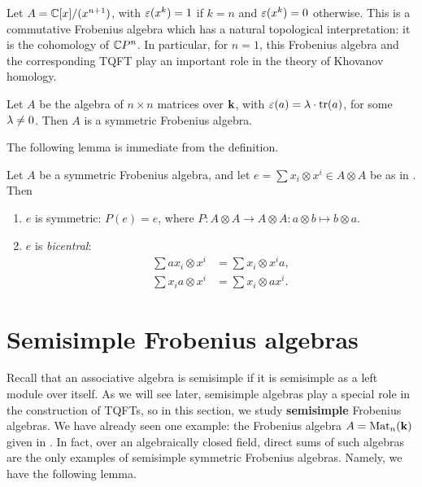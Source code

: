 \begin{example}\label{x:frobenius1}
  Let $A=\mathbb{C}[x]/(x^{n+1})$, with $\varepsilon(x^k)=1$ if $k=n$ and
  $\varepsilon(x^k)=0$ otherwise. This is a commutative Frobenius algebra which
  has a natural topological interpretation: it is the cohomology of
  $\mathbb{C} P^n$. In particular, for $n=1$, this Frobenius algebra and the
  corresponding TQFT play an important role in the theory of Khovanov
  homology.
\end{example}
\begin{example} \label{x:frobenius2}
  Let $A$ be the algebra of $n\times n$ matrices over $\mathbf{k}$,
  with $\varepsilon(a)=\lambda\cdot\operatorname{tr}(a)$, for some $\lambda\ne 0$. Then $A$
  is a symmetric Frobenius algebra.
\end{example}

The following lemma is immediate from the definition.
\begin{lemma}\label{l:bicentral}
  Let $A$ be a symmetric Frobenius algebra, and let
  $e=\sum x_i\otimes x^i\in A\otimes A$ be as in . Then
  \begin{enumerate}
    \item $e$ is symmetric: $P(e)=e$, where $P\colon A\otimes A\to A\otimes
    A\colon a\otimes b\mapsto b\otimes a$.
    \item $e$ is \emph{bicentral}:
    \begin{align*}
      \sum ax_i\otimes x^i&=\sum x_i\otimes x^i a,\\
      \sum x_ia\otimes x^i&=\sum x_i\otimes ax^i.
      \end{align*}
    \end{enumerate}
\end{lemma}
\section{Semisimple Frobenius algebras}\label{s:frobenius-ss}

Recall that an associative algebra is semisimple if it is semisimple
as a left module over itself. As we will see later, semisimple
algebras play a special role in the
construction of TQFTs, so in this section, we study \textbf{semisimple}
Frobenius algebras. We have already seen one example: the Frobenius algebra
$A=\operatorname{Mat}_n(\mathbf{k})$ given in . In fact, over an algebraically
closed field, direct sums of such algebras are the only examples of semisimple
symmetric Frobenius algebras. Namely, we have the following lemma.

